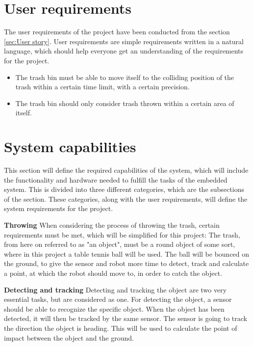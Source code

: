 \section{User requirements}
\label{sec:User requirements}
The user requirements of the project have been conducted from the section \ref{sec:User story}. User requirements are simple requirements written in a natural language, which should help everyone get an understanding of the requirements for the project.

\begin{itemize}
\item The trash bin must be able to move itself to the colliding position of the trash within a certain time limit, with a certain precision.
\item The trash bin should only consider trash thrown within a certain area of itself.
\end{itemize}

\section{System capabilities}
\label{sec:System capabilities}
This section will define the required capabilities of the system, which will include the functionality and hardware needed to fulfill the tasks of the embedded system. This is divided into three different categories, which are the subsections of the section. These categories, along with the user requirements, will define the system requirements for the project.

\textbf{Throwing}\newline
When considering the process of throwing the trash, certain requirements must be met, which will be simplified for this project:
The trash, from here on referred to as "an object", must be a round object of some sort, where in this project a table tennis ball will be used.  \newline
The ball will be bounced on the ground, to give the sensor and robot more time to detect, track and calculate a point, at which the robot should move to, in order to catch the object.

\textbf{Detecting and tracking}\newline
Detecting and tracking the object are two very essential tasks, but are considered as one. For detecting the object, a sensor should be able to recognize the specific object. \newline
When the object has been detected, it will then be tracked by the same sensor. The sensor is going to track the direction the object is heading. This will be used to calculate the point of impact between the object and the ground.

